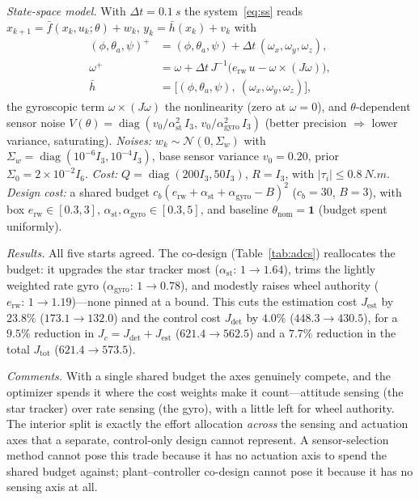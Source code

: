 \documentclass[twocolumn,amsthm]{autart}
\begin{document}
\emph{State-space model.} With $\Delta t=\SI{0.1}{s}$ the system~\eqref{eq:ss}
reads $x_{k+1}=\bar f(x_k,u_k;\theta)+w_k$, $y_k=\bar h(x_k)+v_k$ with
\begin{subequations}\label{eq:adcs-model}
\begin{align}
(\phi,\theta_a,\psi)^{+} &= (\phi,\theta_a,\psi) + \Delta t\,(\omega_x,\omega_y,\omega_z),\\
\omega^{+} &= \omega + \Delta t\,J^{-1}\!\big(e_{\mathrm{rw}}\,u - \omega\times(J\omega)\big),\\
\bar h &= \big[(\phi,\theta_a,\psi),\ (\omega_x,\omega_y,\omega_z)\big],
\end{align}
\end{subequations}
the gyroscopic term $\omega\times(J\omega)$ the nonlinearity (zero at
$\omega=0$), and $\theta$-dependent sensor noise
$V(\theta)=\operatorname{diag}(v_0/\alpha_{\mathrm{st}}^2\,I_3,\,v_0/\alpha_{\mathrm{gyro}}^2\,I_3)$
(better precision $\Rightarrow$ lower variance, saturating). \emph{Noises:}
$w_k\sim\mathcal N(0,\Sigma_w)$ with
$\Sigma_w=\operatorname{diag}(10^{-6}I_3,10^{-4}I_3)$, base sensor variance
$v_0=0.20$, prior $\Sigma_0=2\!\times\!10^{-2}I_6$. \emph{Cost:}
$Q=\operatorname{diag}(200I_3,50I_3)$, $R=I_3$, with $|\tau_i|\le\SI{0.8}{N.m}$.
\emph{Design cost:} a shared budget $c_b(e_{\mathrm{rw}}+\alpha_{\mathrm{st}}+
\alpha_{\mathrm{gyro}}-B)^2$ ($c_b=30$, $B=3$), with box
$e_{\mathrm{rw}}\in[0.3,3]$, $\alpha_{\mathrm{st}},\alpha_{\mathrm{gyro}}\in[0.3,5]$,
and baseline $\theta_{\mathrm{nom}}=\mathbf 1$ (budget spent uniformly).

\emph{Results.} All five starts agreed.
The co-design (Table~\ref{tab:adcs}) reallocates the budget:
it upgrades the star tracker most ($\alpha_{\mathrm{st}}\!:\,1\to1.64$), trims the
lightly weighted rate gyro ($\alpha_{\mathrm{gyro}}\!:\,1\to0.78$), and modestly
raises wheel authority ($e_{\mathrm{rw}}\!:\,1\to1.19$)---none pinned at a bound.
This cuts the estimation cost $J_{\mathrm{est}}$ by $23.8\%$ ($173.1\to132.0$) and
the control cost $J_{\mathrm{det}}$ by $4.0\%$ ($448.3\to430.5$), for a $9.5\%$
reduction in $J_c=J_{\mathrm{det}}+J_{\mathrm{est}}$ ($621.4\to562.5$) and a $7.7\%$
reduction in the total $J_{\mathrm{tot}}$ ($621.4\to573.5$).

\emph{Comments.} With a single shared budget the axes genuinely compete, and the
optimizer spends it where the cost weights make it count---attitude sensing (the
star tracker) over rate sensing (the gyro), with a little left for wheel
authority. The interior split is exactly the effort allocation \emph{across} the
sensing and actuation axes that a separate, control-only design cannot represent.
A sensor-selection method \cite{joshi2009sensor,tzoumas2016sensor} cannot pose
this trade because it has no actuation axis to spend the shared budget against;
plant--controller co-design cannot pose it because it has no sensing axis at all.
\end{document}
